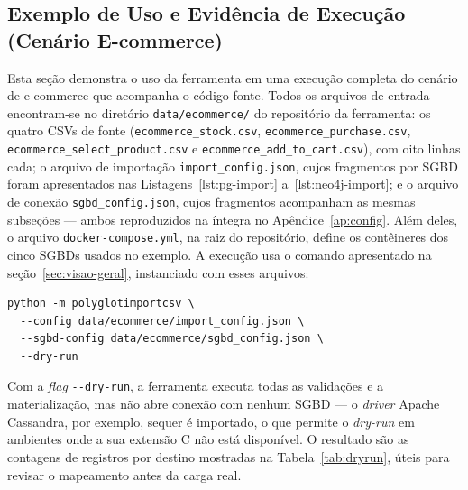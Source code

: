 \subsection{Exemplo de Uso e Evidência de Execução (Cenário E-commerce)}
\label{sec:exemplo-uso}

Esta seção demonstra o uso da ferramenta em uma execução completa do cenário de
e-commerce que acompanha o código-fonte. Todos os arquivos de entrada encontram-se no
diretório \texttt{data/\allowbreak ecommerce/} do repositório da ferramenta: os quatro
CSVs de fonte (\texttt{ecommerce\_\allowbreak stock.csv},
\texttt{ecommerce\_\allowbreak purchase.csv},
\texttt{ecommerce\_\allowbreak select\_product.csv} e
\texttt{ecommerce\_\allowbreak add\_to\_cart.csv}), com oito linhas cada; o arquivo de
importação \texttt{import\_config.json}, cujos fragmentos por SGBD foram apresentados nas
Listagens~\ref{lst:pg-import} a~\ref{lst:neo4j-import}; e o arquivo de conexão
\texttt{sgbd\_config.json}, cujos fragmentos acompanham as mesmas subseções --- ambos
reproduzidos na íntegra no Apêndice~\ref{ap:config}. Além deles, o arquivo
\texttt{docker-compose.yml}, na raiz do repositório, define os contêineres dos cinco
SGBDs usados no exemplo. A execução usa o comando apresentado na
seção~\ref{sec:visao-geral}, instanciado com esses arquivos:

\begin{lstlisting}[style=bashstyle]
python -m polyglotimportcsv \
  --config data/ecommerce/import_config.json \
  --sgbd-config data/ecommerce/sgbd_config.json \
  --dry-run
\end{lstlisting}

Com a \textit{flag} \texttt{-{}-dry-run}, a ferramenta executa todas as validações e a
materialização, mas não abre conexão com nenhum SGBD --- o \textit{driver} Apache
Cassandra, por exemplo, sequer é importado, o que permite o \textit{dry-run} em
ambientes onde a sua extensão C não está disponível. O resultado são as contagens de
registros por destino mostradas na Tabela~\ref{tab:dryrun}, úteis para revisar o
mapeamento antes da carga real.


